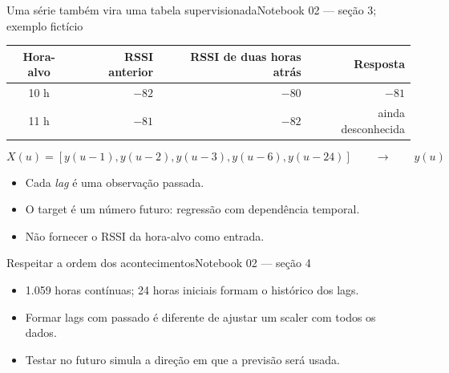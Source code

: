 \documentclass[aspectratio=169,10pt]{beamer}
\begin{document}
\begin{frame}{Uma série também vira uma tabela supervisionada}{Notebook 02 — seção 3; exemplo fictício}
\centering
\begin{tabular}{c r r r}
\toprule
Hora-alvo & RSSI anterior & RSSI de duas horas atrás & Resposta\\
\midrule
10 h & $-82$ & $-80$ & $-81$\\
11 h & $-81$ & $-82$ & ainda desconhecida\\
\bottomrule
\end{tabular}
\vspace{4mm}
\[
X(u)=[y(u-1),y(u-2),y(u-3),y(u-6),y(u-24)]
\qquad\longrightarrow\qquad y(u)
\]
\begin{itemize}
\item Cada \emph{lag} é uma observação passada.
\item O target é um número futuro: regressão com dependência temporal.
\item Não fornecer o RSSI da hora-alvo como entrada.
\end{itemize}
\end{frame}

\begin{frame}{Respeitar a ordem dos acontecimentos}{Notebook 02 — seção 4}
\centering
{}
\vspace{4mm}
\begin{itemize}
\item 1.059 horas contínuas; 24 horas iniciais formam o histórico dos lags.
\item Formar lags com passado é diferente de ajustar um scaler com todos os dados.
\item Testar no futuro simula a direção em que a previsão será usada.
\end{itemize}
\end{frame}
\end{document}
